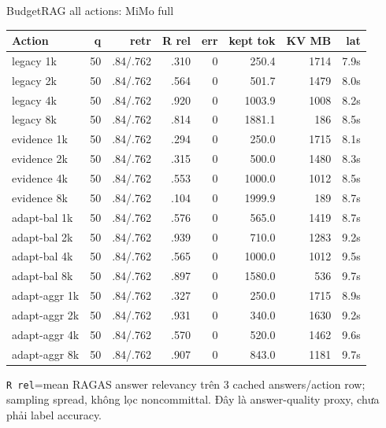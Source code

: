 \documentclass[aspectratio=169,10pt]{beamer}
\newcommand{\smallcode}[1]{\texttt{\scriptsize #1}}
\newcommand{\takeaway}[1]{%
  \vspace{0.46em}
  \noindent\colorbox{Soft}{%
    \parbox{\dimexpr\linewidth-2\fboxsep}{\color{Ink}\strut #1\strut}%
  }%
}
\begin{document}
\begin{frame}{BudgetRAG all actions: MiMo full}
  \tiny
  \setlength{\tabcolsep}{2.6pt}
  \renewcommand{\arraystretch}{1.06}
  \begin{tabular}{>{\raggedright\arraybackslash}p{}r r r r r r r}
    \toprule
    Action & q & retr & R rel & err & kept tok & KV MB & lat \\
    \midrule
    legacy 1k & 50 & .84/.762 & .310 & 0 & 250.4 & 1714 & 7.9s \\
    legacy 2k & 50 & .84/.762 & .564 & 0 & 501.7 & 1479 & 8.0s \\
    legacy 4k & 50 & .84/.762 & .920 & 0 & 1003.9 & 1008 & 8.2s \\
    legacy 8k & 50 & .84/.762 & .814 & 0 & 1881.1 & 186 & 8.5s \\
    evidence 1k & 50 & .84/.762 & .294 & 0 & 250.0 & 1715 & 8.1s \\
    evidence 2k & 50 & .84/.762 & .315 & 0 & 500.0 & 1480 & 8.3s \\
    evidence 4k & 50 & .84/.762 & .553 & 0 & 1000.0 & 1012 & 8.5s \\
    evidence 8k & 50 & .84/.762 & .104 & 0 & 1999.9 & 189 & 8.7s \\
    adapt-bal 1k & 50 & .84/.762 & .576 & 0 & 565.0 & 1419 & 8.7s \\
    adapt-bal 2k & 50 & .84/.762 & .939 & 0 & 710.0 & 1283 & 9.2s \\
    adapt-bal 4k & 50 & .84/.762 & .565 & 0 & 1000.0 & 1012 & 9.5s \\
    adapt-bal 8k & 50 & .84/.762 & .897 & 0 & 1580.0 & 536 & 9.7s \\
    adapt-aggr 1k & 50 & .84/.762 & .327 & 0 & 250.0 & 1715 & 8.9s \\
    adapt-aggr 2k & 50 & .84/.762 & .931 & 0 & 340.0 & 1630 & 9.2s \\
    adapt-aggr 4k & 50 & .84/.762 & .570 & 0 & 520.0 & 1462 & 9.6s \\
    adapt-aggr 8k & 50 & .84/.762 & .907 & 0 & 843.0 & 1181 & 9.7s \\
    \bottomrule
  \end{tabular}
  \vspace{0.16cm}
  \takeaway{\scriptsize \smallcode{R rel}=mean RAGAS answer relevancy trên 3 cached answers/action row; sampling spread, không lọc noncommittal. Đây là answer-quality proxy, chưa phải label accuracy.}
\end{frame}
\end{document}
